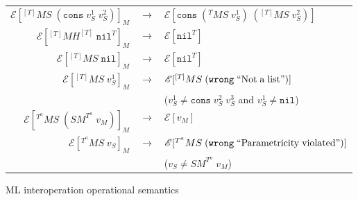 \begin{figure}
\begin{center}
\begin{tabular}{rcl}
$\mathscr{E}[^{[T]}MS\;(\mathtt{cons}\;v_{S}^{1}\;v_{S}^{2})]_{M}$ & $\rightarrow$ & $\mathscr{E}[\mathtt{cons}\;(^{T}MS\;v_{S}^{1})\;(^{[T]}MS\;v_{S}^{2})]$ \\
$\mathscr{E}[^{[T]}MH^{[T]}\;\mathtt{nil}^{T}]_{M}$ & $\rightarrow$ & $\mathscr{E}[\mathtt{nil}^{T}]$ \\
$\mathscr{E}[^{[T]}MS\;\mathtt{nil}]_{M}$ & $\rightarrow$ & $\mathscr{E}[\mathtt{nil}^{T}]$ \\
$\mathscr{E}[^{[T]}MS\;v_{S}^{1}]_{M}$ & $\rightarrow$ & $\mathscr{E}[^{[T]}MS\;(\mathtt{wrong}\;\mathrm{``Not\;a\;list"})]$ \\
&& ($v_{S}^{1}\neq\mathtt{cons}\;v_{S}^{2}\;v_{S}^{3}$ and $v_{S}^{1}\neq\mathtt{nil}$) \\
$\mathscr{E}[^{T^{a}}MS\;(SM^{T^{a}}\;v_{M})]_{M}$ & $\rightarrow$ & $\mathscr{E}[v_{M}]$ \\
$\mathscr{E}[^{T^{a}}MS\;v_{S}]_{M}$ & $\rightarrow$ & $\mathscr{E}[^{T^{a}}MS\;(\mathtt{wrong}\;\mathrm{``Parametricity\;violated"})]$ \\
&& ($v_{S}\neq SM^{T^{a}}\;v_{M}$)
\end{tabular}
\end{center}
\caption{ML interoperation operational semantics}
\label{fig:mios}
\end{figure}
